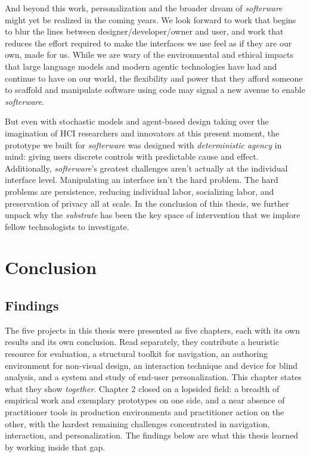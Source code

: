 \documentclass[12pt]{cmuthesis}
\begin{document}
And beyond this work, personalization and the broader dream of \textit{softerware} might yet be realized in the coming years. We look forward to work that begins to blur the lines between designer/developer/owner and user, and work that reduces the effort required to make the interfaces we use feel as if they are our own, made for us. While we are wary of the environmental and ethical impacts that large language models and modern agentic technologies have had and continue to have on our world, the flexibility and power that they afford someone to scaffold and manipulate software using code may signal a new avenue to enable \textit{softerware}.

But even with stochastic models and agent-based design taking over the imagination of HCI researchers and innovators at this present moment, the prototype we built for \textit{softerware} was designed with \textit{deterministic agency} in mind: giving users discrete controls with predictable cause and effect. Additionally, \textit{softerware}'s greatest challenges aren't actually at the individual interface level. Manipulating an interface isn't the hard problem. The hard problems are persistence, reducing individual labor, socializing labor, and preservation of privacy all at scale. In the conclusion of this thesis, we further unpack why the \textit{substrate} has been the key space of intervention that we implore fellow technologists to investigate.

\part{Conclusion}

\chapter{Findings}

The five projects in this thesis were presented as five chapters, each with its own results and its own conclusion. Read separately, they contribute a heuristic resource for evaluation, a structural toolkit for navigation, an authoring environment for non-visual design, an interaction technique and device for blind analysis, and a system and study of end-user personalization. This chapter states what they show \textit{together}. Chapter 2 closed on a lopsided field: a breadth of empirical work and exemplary prototypes on one side, and a near absence of practitioner tools in production environments and practitioner action on the other, with the hardest remaining challenges concentrated in navigation, interaction, and personalization. The findings below are what this thesis learned by working inside that gap.
\end{document}
